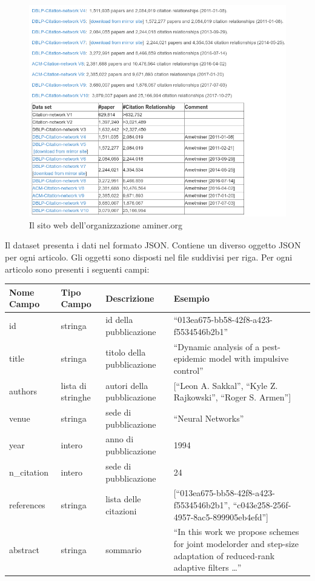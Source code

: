 \documentclass[a4paper, 12pt]{article}
\begin{document}
\begin{figure}[H]
  \includegraphics[width=\linewidth]{images/aminer.jpg}
  \caption{Il sito web dell'organizzazione aminer.org}
\end{figure}

Il dataset presenta i dati nel formato JSON. Contiene un diverso oggetto JSON per ogni articolo. Gli oggetti sono disposti nel file suddivisi per riga.
Per ogni articolo sono presenti i seguenti campi: \\
\begin{tabularx}{\textwidth}{| X | X | X | X |}
\hline \textbf{Nome Campo} & \textbf{Tipo Campo} & \textbf{Descrizione} & \textbf{Esempio} \\
\hline id & stringa & id della pubblicazione & ``013ea675-bb58-42f8-a423-f5534546b2b1''\\
\hline title & stringa & titolo della pubblicazione & ``Dynamic analysis of a pest-epidemic model with impulsive control'' \\
\hline authors & lista di stringhe & autori della pubblicazione & [``Leon A. Sakkal'', ``Kyle Z. Rajkowski'', ``Roger S. Armen'']\\
\hline venue & stringa & sede di pubblicazione & ``Neural Networks'' \\
\hline year & intero & anno di pubblicazione & 1994 \\
\hline n\_citation & intero & sede di pubblicazione & 24 \\
\hline references & stringa & lista delle citazioni & [``013ea675-bb58-42f8-a423-f5534546b2b1'', ``c043e258-256f-4957-8ac5-899905eb4efd'']\\
\hline abstract & stringa & sommario & ``In this work we propose schemes for joint modelorder and step-size adaptation of reduced-rank adaptive filters \ldots''\\
\hline
\end{tabularx}
\end{document}
